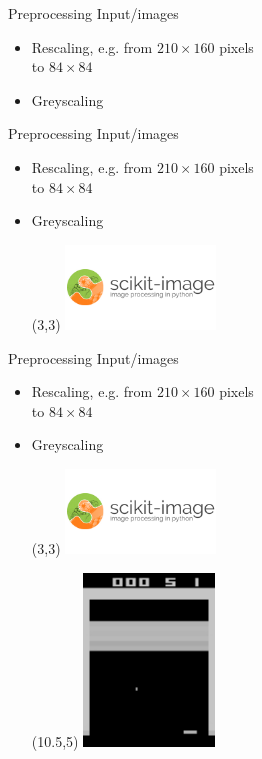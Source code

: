 \documentclass{beamer}
\begin{document}
\begin{frame}{Preprocessing Input/images}
\begin{itemize}
	\item {Rescaling, e.g. from $210 \times 160$ pixels\\
	to $84 \times 84$}
	\pause
	\item {Greyscaling}	
\end{itemize}

\end{frame}
\begin{frame}{Preprocessing Input/images}
	\begin{itemize}
		\item {Rescaling, e.g. from $210 \times 160$ pixels\\
	to $84 \times 84$}
		\item {Greyscaling}
		\begin{textblock}{20}(3,3)
			\includegraphics[width = 4cm]{Images/skimage_logo}
		\end{textblock}
	\end{itemize}
\end{frame}
\begin{frame}{Preprocessing Input/images}
	\begin{itemize}
		\item {Rescaling, e.g. from $210 \times 160$ pixels\\
	to $84 \times 84$}
		\item {Greyscaling}
		\begin{textblock}{20}(3,3)
			\includegraphics[width = 4cm]{Images/skimage_logo}
		\end{textblock}
		\begin{textblock}{20}(10.5,5)
			\includegraphics[width = 3.5cm]{Images/breakout_greyscaled}
		\end{textblock}	
	\end{itemize}
\end{frame}
\end{document}
